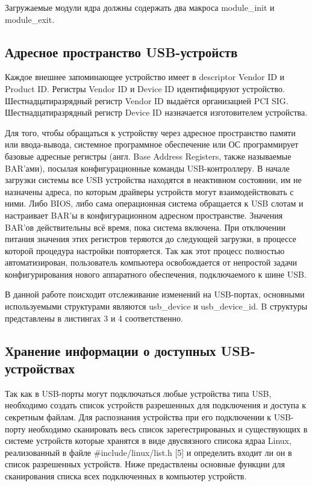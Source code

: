 \documentclass[a4paper, 10pt]{article}
\begin{document}
	Загружаемые модули ядра должны содержать два макроса module\_init и module\_exit.
	
	\subsection{Адресное пространство  USB-устройств}
	\hspace*{5mm}Каждое внешнее запоминающее устройство имеет в descriptor Vendor ID и Product ID. Регистры Vendor ID и Device ID идентифицируют устройство. Шестнадцатиразрядный регистр Vendor ID выдаётся организацией PCI SIG. Шестнадцатиразрядный регистр Device ID назначается изготовителем устройства.
	
	Для того, чтобы обращаться к устройству через адресное пространство памяти или ввода-вывода, системное программное обеспечение или ОС программирует базовые адресные регистры (англ. Base Address Registers, также называемые BAR’ами), посылая конфигурационные команды USB-контроллеру. В начале загрузки системы все USB устройства находятся в неактивном состоянии, им не назначены адреса, по которым драйверы устройств могут взаимодействовать с ними. Либо BIOS, либо сама операционная система обращается к USB слотам и настраивает BAR’ы в конфигурационном адресном пространстве. Значения BAR’ов действительны всё время, пока система включена. При отключении питания значения этих регистров теряются до следующей загрузки, в процессе которой процедура настройки повторяется. Так как этот процесс полностью автоматизирован, пользователь компьютера освобождается от непростой задачи конфигурирования нового аппаратного обеспечения, подключаемого к шине USB.
	

	В данной работе поисходит отслеживание изменений на USB-портах, основными используемыми структурами являются usb\_device и usb\_device\_id. B структуры представлены в листингах 3 и 4 соответственно.
	\subsection{Хранение информации о доступных USB-устройствах}
	Так как в USB-порты могут подключаться любые устройства типа USB, необходимо создать список устройств разрешенных для подключения и доступа к секретным файлам. Для распознания устройства при его подключении к USB-порту необходимо сканировать весь список зарегестрированых и существующих в системе устройств которые хранятся в виде двусвязного списока ядраа Linux, реализованный в файле \#include/linux/list.h [5] и определить входит ли он в список разрешенных устройств. Ниже предаствлены основные функции для сканирования списка всех подключенных в компьютер устройств.
	
\end{document}

